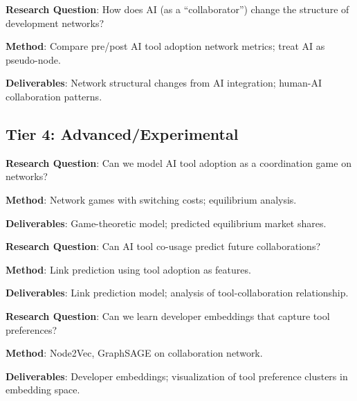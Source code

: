 \documentclass[11pt,letterpaper]{article}
\begin{document}
\begin{tcolorbox}[colback=yellow!5,colframe=yellow!50!black,title=Project 3E: Bot vs. Human Collaboration Networks]
\textbf{Research Question}: How does AI (as a ``collaborator'') change the structure of development networks?

\textbf{Method}: Compare pre/post AI tool adoption network metrics; treat AI as pseudo-node.

\textbf{Deliverables}: Network structural changes from AI integration; human-AI collaboration patterns.
\end{tcolorbox}

\subsection{Tier 4: Advanced/Experimental}

\begin{tcolorbox}[colback=red!5,colframe=red!50!black,title=Project 4A: Game-Theoretic Model of Tool Competition]
\textbf{Research Question}: Can we model AI tool adoption as a coordination game on networks?

\textbf{Method}: Network games with switching costs; equilibrium analysis.

\textbf{Deliverables}: Game-theoretic model; predicted equilibrium market shares.
\end{tcolorbox}

\begin{tcolorbox}[colback=red!5,colframe=red!50!black,title=Project 4B: Link Prediction for Future Collaborations]
\textbf{Research Question}: Can AI tool co-usage predict future collaborations?

\textbf{Method}: Link prediction using tool adoption as features.

\textbf{Deliverables}: Link prediction model; analysis of tool-collaboration relationship.
\end{tcolorbox}

\begin{tcolorbox}[colback=red!5,colframe=red!50!black,title=Project 4C: Network Embedding for Developer Similarity]
\textbf{Research Question}: Can we learn developer embeddings that capture tool preferences?

\textbf{Method}: Node2Vec, GraphSAGE on collaboration network.

\textbf{Deliverables}: Developer embeddings; visualization of tool preference clusters in embedding space.
\end{tcolorbox}
\end{document}

